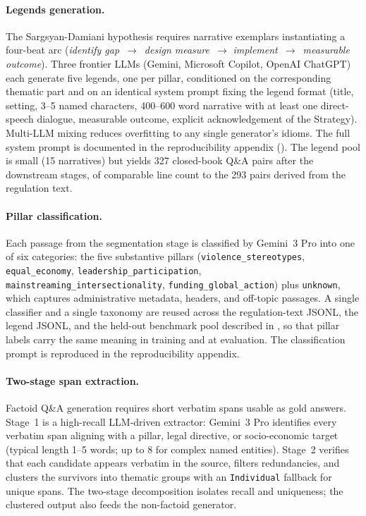 \documentclass[pdflatex, sn-apa]{sn-jnl}%
\theoremstyle{thmstyleone}%
\theoremstyle{thmstyletwo}%
\theoremstyle{thmstylethree}%
\begin{document}
\paragraph{Legends generation.}
The Sargsyan-Damiani hypothesis requires narrative exemplars instantiating
a four-beat arc (\emph{identify gap}~$\to$~\emph{design measure}~$\to$
\emph{implement}~$\to$~\emph{measurable outcome}). Three frontier LLMs
(Gemini, Microsoft Copilot, OpenAI ChatGPT) each generate five legends,
one per pillar, conditioned on the corresponding thematic part and on an
identical system prompt fixing the legend format (title, setting, 3--5
named characters, 400--600 word narrative with at least one direct-speech
dialogue, measurable outcome, explicit acknowledgement of the Strategy).
Multi-LLM mixing reduces overfitting to any single generator's idioms.
The full system prompt is documented in the reproducibility appendix
(). The legend pool is small (15 narratives) but
yields 327 closed-book Q\&A pairs after the downstream stages, of
comparable line count to the 293 pairs derived from the regulation text.

\paragraph{Pillar classification.}
Each passage from the segmentation stage is classified by Gemini~3 Pro
into one of six categories: the five substantive pillars
(\texttt{violence\_stereotypes}, \texttt{equal\_economy},
\texttt{leadership\_participation},
\texttt{mainstreaming\_intersectionality}, \texttt{funding\_global\_action})
plus \texttt{unknown}, which captures administrative metadata, headers,
and off-topic passages. A single classifier and a single taxonomy are
reused across the regulation-text JSONL, the legend JSONL, and the
held-out benchmark pool described in , so that pillar
labels carry the same meaning in training and at evaluation. The
classification prompt is reproduced in the reproducibility appendix.

\paragraph{Two-stage span extraction.}
Factoid Q\&A generation requires short verbatim spans usable as gold
answers. Stage~1 is a high-recall LLM-driven extractor: Gemini~3 Pro
identifies every verbatim span aligning with a pillar, legal directive,
or socio-economic target (typical length 1--5 words; up to 8 for complex
named entities). Stage~2 verifies that each candidate appears verbatim in
the source, filters redundancies, and clusters the survivors into
thematic groups with an \texttt{Individual} fallback for unique spans.
The two-stage decomposition isolates recall and uniqueness; the clustered
output also feeds the non-factoid generator.
\end{document}
